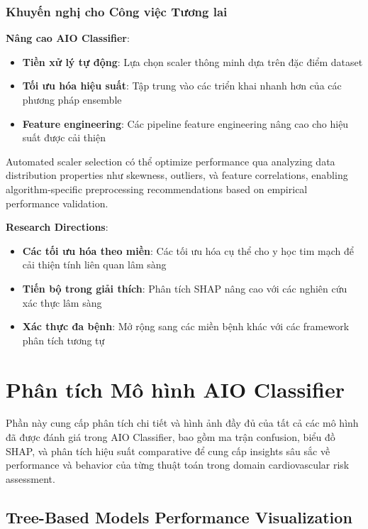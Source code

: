 \subsubsection{Khuyến nghị cho Công việc Tương lai}

\textbf{Nâng cao AIO Classifier}:
\begin{itemize}
    \item \textbf{Tiền xử lý tự động}: Lựa chọn scaler thông minh dựa trên đặc điểm dataset
    \item \textbf{Tối ưu hóa hiệu suất}: Tập trung vào các triển khai nhanh hơn của các phương pháp ensemble
    \item \textbf{Feature engineering}: Các pipeline feature engineering nâng cao cho hiệu suất được cải thiện
\end{itemize}
Automated scaler selection có thể optimize performance qua analyzing data distribution properties như skewness, outliers, và feature correlations, enabling algorithm-specific preprocessing recommendations based on empirical performance validation.

\textbf{Research Directions}:
\begin{itemize}
    \item \textbf{Các tối ưu hóa theo miền}: Các tối ưu hóa cụ thể cho y học tim mạch để cải thiện tính liên quan lâm sàng
    \item \textbf{Tiến bộ trong giải thích}: Phân tích SHAP nâng cao với các nghiên cứu xác thực lâm sàng
    \item \textbf{Xác thực đa bệnh}: Mở rộng sang các miền bệnh khác với các framework phân tích tương tự
\end{itemize}

\section{Phân tích Mô hình AIO Classifier}\label{subsec:comprehensive-analysis}

\noindent
Phần này cung cấp phân tích chi tiết và hình ảnh đầy đủ của tất cả các mô hình đã được đánh giá trong AIO Classifier, bao gồm ma trận confusion, biểu đồ SHAP, và phân tích hiệu suất comparative để cung cấp insights sâu sắc về performance và behavior của từng thuật toán trong domain cardiovascular risk assessment.

\subsection{Tree-Based Models Performance Visualization}

